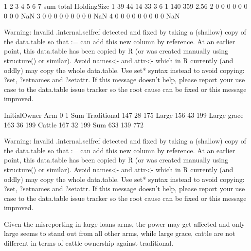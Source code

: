 
\begin{Schunk}
\begin{Soutput}
   1  2  3  4 5 6 7 sum total HoldingSize
1 39 44 14 33 3 6 1 140   359        2.56
2  0  0  0  0 0 0 0   0     0         NaN
3  0  0  0  0 0 0 0   0     0         NaN
4  0  0  0  0 0 0 0   0     0         NaN
\end{Soutput}
\begin{Soutput}
Warning: Invalid .internal.selfref detected and fixed by taking a (shallow) copy of the data.table so that := can add this new column by reference. At an earlier point, this data.table has been copied by R (or was created manually using structure() or similar). Avoid names<- and attr<- which in R currently (and oddly) may copy the whole data.table. Use set* syntax instead to avoid copying: ?set, ?setnames and ?setattr. If this message doesn't help, please report your use case to the data.table issue tracker so the root cause can be fixed or this message improved.
\end{Soutput}
\end{Schunk}
\begin{Schunk}
\begin{Soutput}
             InitialOwner
Arm             0   1 Sum
  Traditional 147  28 175
  Large       156  43 199
  Large grace 163  36 199
  Cattle      167  32 199
  Sum         633 139 772
\end{Soutput}
\begin{Soutput}
Warning: Invalid .internal.selfref detected and fixed by taking a (shallow) copy of the data.table so that := can add this new column by reference. At an earlier point, this data.table has been copied by R (or was created manually using structure() or similar). Avoid names<- and attr<- which in R currently (and oddly) may copy the whole data.table. Use set* syntax instead to avoid copying: ?set, ?setnames and ?setattr. If this message doesn't help, please report your use case to the data.table issue tracker so the root cause can be fixed or this message improved.
\end{Soutput}
\end{Schunk}
Given the misreporting in large loans arms, the power may get affected and only \textsf{large} seems to stand out from all other arms, while \textsf{large grace, cattle} are not different in terms of cattle ownership against \textsf{traditional}. 








